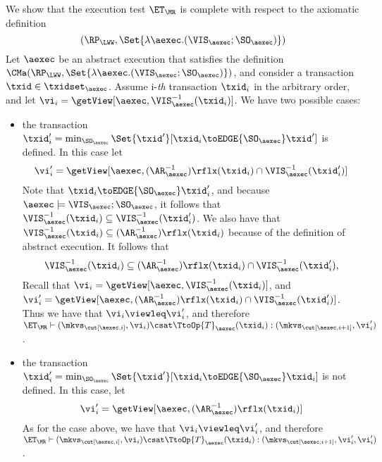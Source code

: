 We show that the execution test $\ET_{\MR}$ is complete 
with respect to the axiomatic definition 
\[(\RP_{\LWW}, \Set{\lambda \aexec.(\VIS_{\aexec};\SO_{\aexec})})\]
Let $\aexec$ be an abstract execution that satisfies the definition
$\CMa(\RP_{\LWW}, \Set{\lambda \aexec.(\VIS_{\aexec};\SO_{\aexec})})$, 
and consider a transaction $\txid \in \txidset_{\aexec}$. 
Assume i-\emph{th} transaction \( \txid_i \) in the arbitrary order,
and let $\vi_i = \getView[\aexec, \VIS^{-1}_{\aexec}(\txid_{i})]$.
We have two possible cases: 
\begin{itemize}
    \item the transaction $\txid'_{i} = \min_{\SO_{\aexec}}\Set{\txid' }[ \txid_{i} \toEDGE{\SO_{\aexec}} \txid']$ is 
defined. In this case let 
\[\vi'_{i} =\getView[\aexec, (\AR^{-1}_{\aexec})\rflx(\txid_{i}) \cap \VIS^{-1}_{\aexec}(\txid'_{i})]\]
Note that $\txid_{i} \toEDGE{\SO_{\aexec}} \txid'_{i}$, and because $\aexec \models \VIS_{\aexec} ; \SO_{\aexec}$, 
it follows that $\VIS^{-1}_{\aexec}(\txid_{i}) \subseteq \VIS^{-1}_{\aexec}(\txid'_{i})$. 
We also have that $\VIS^{-1}_{\aexec}(\txid_{i}) \subseteq (\AR^{-1}_{\aexec})\rflx(\txid_{i})$ because of 
the definition of abstract execution. It follows that 
\[
\VIS^{-1}_{\aexec}(\txid_{i}) \subseteq (\AR^{-1}_{\aexec})\rflx(\txid_{i}) \cap \VIS^{-1}_{\aexec}(\txid'_{i}),
\]
Recall that  $\vi_i = \getView[\aexec, \VIS^{-1}_{\aexec}(\txid_{i})]$,
and $\vi'_{i} =\getView[\aexec, (\AR^{-1}_{\aexec})\rflx(\txid_{i}) \cap \VIS^{-1}_{\aexec}(\txid'_{i})]$.
Thus we have that $\vi_i \viewleq \vi'_{i}$, and therefore $\ET_{\MR} \vdash (\mkvs_{\cut[\aexec, i]}, \vi_i) 
\csat \TtoOp{T}_{\aexec}(\txid_{i}) : (\mkvs_{\cut[\aexec, i+1]},\vi'_{i})$. 
\item the transaction $\txid'_{i} = \min_{\SO_{\aexec}}\Set{\txid' }[ \txid_{i} \toEDGE{\SO_{\aexec}} \txid_{i}]$ 
is not defined. In this case, let 
\[\vi'_{i} = \getView[\aexec, (\AR^{-1}_{\aexec})\rflx(\txid_{i})]\]
As for the case above, we have that $\vi_i \viewleq \vi'_{i}$, and therefore 
$\ET_{\MR} \vdash (\mkvs_{\cut[\aexec, i]}, \vi_i) \csat \TtoOp{T}_{\aexec}(\txid_{i}) : (\mkvs_{\cut[\aexec, i+1]},\vi'_{i},\vi'_{i})$. 
\end{itemize}
